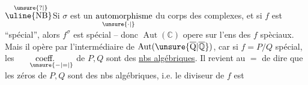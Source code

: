 \(\overset{\hspace{0.55em}\unsure{?|}}{\text{\uline{NB}}}\)\quad Si $\sigma$ est un $\underset{\hspace{-1.3em}\unsure{\cdot|}}{\text{automorphisme}}$ du corps des complexes, et si $f$ est ``spécial'', alors $f^\sigma$ est  spécial -- donc $\operatorname{Aut}(\mathbb C)$ opere sur l'ens des $f$ spèciaux. Mais il opère par l'intermédiaire de $\operatorname{Aut}(\unsure{\overline{\mathrm Q}|\overline{\mathbb Q}})$, car si $f=P/Q$ spécial, les $\underset{\hspace{1.5em}\unsure{-|=|}}{\text{coeff.}}$ de $P,Q$ sont des \uline{nbs algébriques}. Il revient au $=$ de dire que les zéros de $P,Q$ sont des nbs algébriques, i.e. le diviseur de $f$ est

